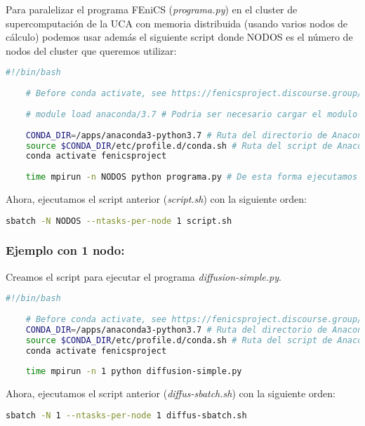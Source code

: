 Para paralelizar el programa FEniCS (\textit{programa.py}) en el cluster de supercomputación de la UCA con memoria distribuida (usando varios nodos de cálculo) podemos usar además el siguiente script donde NODOS es el número de nodos del cluster que queremos utilizar:
\begin{lstlisting}[language=sh]
	#!/bin/bash
	
	# Before conda activate, see https://fenicsproject.discourse.group/t/fenics-from-conda-doesnt-import/3502/6
	
	# module load anaconda/3.7 # Podria ser necesario cargar el modulo si necesitamos actualizar las variables de tipo $PATH de nuestra shell con las que incorpora el modulo, por ejemplo, si hacemos una instalacion local de anaconda y queremos usar la instalacion sudo
	
	CONDA_DIR=/apps/anaconda3-python3.7 # Ruta del directorio de Anaconda
	source $CONDA_DIR/etc/profile.d/conda.sh # Ruta del script de Anaconda
	conda activate fenicsproject
	
	time mpirun -n NODOS python programa.py # De esta forma ejecutamos tantos procesos como indiquemos con NODOS, hay que cambiar el numero de procesos y ajustarlo al numero de nodos del cluster que queramos usar
\end{lstlisting}

Ahora, ejecutamos el script anterior (\textit{script.sh}) con la siguiente orden:
\begin{lstlisting}[language=sh]
sbatch -N NODOS --ntasks-per-node 1 script.sh
\end{lstlisting}

\subsubsection*{Ejemplo con 1 nodo:}

Creamos el script para ejecutar el programa \textit{diffusion-simple.py}.
\begin{lstlisting}[language=sh]
	#!/bin/bash
	
	# Before conda activate, see https://fenicsproject.discourse.group/t/fenics-from-conda-doesnt-import/3502/6
	CONDA_DIR=/apps/anaconda3-python3.7 # Ruta del directorio de Anaconda
	source $CONDA_DIR/etc/profile.d/conda.sh # Ruta del script de Anaconda
	conda activate fenicsproject
	
	time mpirun -n 1 python diffusion-simple.py
\end{lstlisting}

Ahora, ejecutamos el script anterior (\textit{diffus-sbatch.sh}) con la siguiente orden:
\begin{lstlisting}[language=sh]
	sbatch -N 1 --ntasks-per-node 1 diffus-sbatch.sh
\end{lstlisting}


